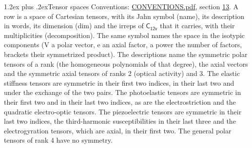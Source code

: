 \documentclass[10pt,a4paper]{article}
\makeatletter
\renewcommand\section{\@startsection{section}{1}{\z@}{-3ex plus -1ex minus -.2ex}%
  {1.2ex plus .2ex}{\normalfont\large\sffamily\bfseries\color{parttitle}}}
\numberwithin{equation}{section}
\newcommand{\grp}[1]{\mathsf{#1}}
\makeatother
\begin{document}
\section{Tensor spaces}\label{s:tensor_spaces}
Conventions: \href{../../CONVENTIONS.pdf}{CONVENTIONS.pdf}, section \href{../../CONVENTIONS.pdf\#conv.13}{13}.
\leavevmode\label{n:head.name}\label{n:head.description}\label{n:head.dim}\label{n:head.decomposition}A row is a space of Cartesian tensors, with its Jahn symbol (name), its description in words, its dimension (dim) and the irreps of $\grp{C_{12v}}$ that it carries, with their multiplicities (decomposition). \label{n:label.jahn}The same symbol names the space in the isotypic components (V a polar vector, e an axial factor, a power the number of factors, brackets their symmetrized product). The descriptions name the symmetric polar tensors of a rank (the homogeneous polynomials of that degree), the axial vectors and the symmetric axial tensors of ranks 2 (optical activity) and 3. The elastic stiffness tensors are symmetric in their first two indices, in their last two and under the exchange of the two pairs. The photoelastic tensors are symmetric in their first two and in their last two indices, as are the electrostriction and the quadratic electro-optic tensors. The piezoelectric tensors are symmetric in their last two indices, the third-harmonic susceptibilities in their last three and the electrogyration tensors, which are axial, in their first two. The general polar tensors of rank 4 have no symmetry.
\end{document}
